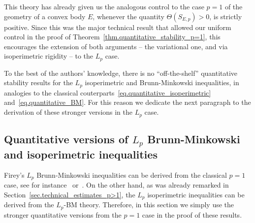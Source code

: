 \documentclass[a4paper, 10pt, twoside]{amsart}
\numberwithin{equation}{section}
\theoremstyle{plain}
\theoremstyle{definition}
\begin{document}
This theory has already given us the analogous control to the case $p = 1$ of the geometry of a convex body $E$, whenever the quantity $\Theta(S_{E,p})>0$, is strictly positive. Since this was the major technical result that allowed our uniform control in the proof of Theorem~\ref{thm.quantitative_stability_p=1}, this encourages the extension of both arguments -- the variational one, and via isoperimetric rigidity -- to the $L_p$ case.

To the best of the authors' knowledge, there is no ``off-the-shelf'' quantitative stability results for the $L_p$ isoperimetric and Brunn-Minkowski inequalities, in analogies to the classical couterparts~\eqref{eq.quantitative_isoperimetric} and~\eqref{eq.quantitative_BM}. For this reason we dedicate the next paragraph to the derivation of these stronger versions in the $L_p$ case.



\subsection{Quantitative versions of $L_p$ Brunn-Minkowski and isoperimetric inequalities}\label{sec.quantitativeLpBM_iso}

Firey's $L_p$ Brunn-Minkowski inequalities can be derived from the classical $p=1$ case, see for instance~\cite[Thm.~7.6.3]{boroczky2025isoperimetric} or~\cite{firey1962p}. On the other hand, as was already remarked in Section~\ref{sec.technical_estimates_p>1}, the $L_p$ isoperimetric inequalities can be derived from the $L_p$-BM theory. Therefore, in this section we simply use the stronger quantitative versions from the $p=1$ case in the proof of these results. 
\end{document}

